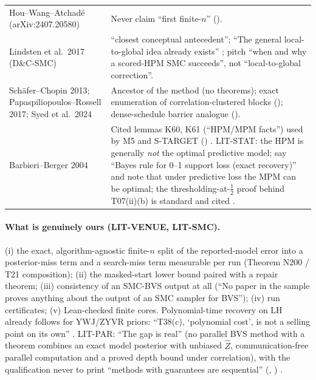 {\begin{xltabular}{\textwidth}{@{}>{\raggedright\arraybackslash}p{3.8cm}>{\raggedright\arraybackslash}X@{}}
Hou--Wang--Atchadé (arXiv:2407.20580) & Never claim ``first finite-$n$'' (). \\
Lindsten et al.\ 2017 (D\&C-SMC) & ``closest conceptual antecedent''; ``The general local-to-global idea already exists'' ; pitch ``when and why a scored-HPM SMC succeeds'', not ``local-to-global correction''. \\
Schäfer--Chopin 2013; Papaspiliopoulos--Rossell 2017; Syed et al.\ 2024 & Ancestor of the method (no theorems); exact enumeration of correlation-clustered blocks (); dense-schedule barrier analogue (). \\
Barbieri--Berger 2004 & Cited lemmas K60, K61 (``HPM/MPM facts'') used by M5 and S-TARGET () . LIT-STAT: the HPM is generally \emph{not} the optimal predictive model; say ``Bayes rule for 0--1 support loss (exact recovery)'' and note that under predictive loss the MPM can be optimal; the thresholding-at-$\tfrac12$ proof behind T07(ii)(b) is standard and cited . \\
\bottomrule
\end{xltabular}
}

\paragraph{What is genuinely ours (LIT-VENUE, LIT-SMC).} (i) the exact, algorithm-agnostic finite-$n$ split of the reported-model error into a posterior-miss term and a search-miss term measurable per run (Theorem N200 / T21 composition); (ii) the masked-start lower bound paired with a repair theorem; (iii) consistency of an SMC-BVS output at all (``No paper in the sample proves anything about the output of an SMC sampler for BVS''); (iv) run certificates; (v) Lean-checked finite cores. Polynomial-time recovery on LH already follows for YWJ/ZYVR priors: ``T38(c), `polynomial cost', is not a selling point on its own'' . LIT-PAR: ``The gap is real'' (no parallel BVS method with a theorem combines an exact model posterior with unbiased $\hat Z$, communication-free parallel computation and a proved depth bound under correlation), with the qualification never to print ``methods with guarantees are sequential'' (, ) .

